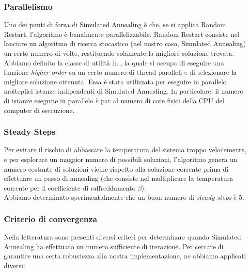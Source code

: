 \subsubsection{Parallelismo}

Uno dei punti di forza di Simulated Annealing è che, se si applica Random Restart, l'algoritmo è banalmente parallelizzabile.
Random Restart consiste nel lanciare un algoritmo di ricerca stocastico (nel nostro caso, Simulated Annealing) un certo numero di volte, restituendo solamente la migliore soluzione trovata. \\

\noindent Abbiamo definito la classe di utilità  in , la quale si occupa di eseguire una funzione \textit{higher-order} su un certo numero di thread paralleli e di selezionare la migliore soluzione ottenuta. Essa è stata utilizzata per eseguire in parallelo molteplici istanze indipendenti di Simulated Annealing. In particolare, il numero di istanze eseguite in parallelo è par al numero di core fisici della CPU del computer di esecuzione.

\subsubsection{Steady Steps}

\noindent Per evitare il rischio di abbassare la temperatura del sistema troppo velocemente, e per esplorare un maggior numero di possibili soluzioni, l'algoritmo genera un numero costante di soluzioni vicine rispetto alla soluzione corrente prima di effettuare un passo di annealing (che consiste nel moltiplicare la temperatura corrente per il coefficiente di raffreddamento $\beta$). \\

\noindent Abbiamo determinato sperimentalmente che un buon numero di \textit{steady steps} è 5.

\subsubsection{Criterio di convergenza}

\noindent Nella letteratura sono presenti diversi criteri per determinare quando Simulated Annealing ha effettuato un numero sufficiente di iterazione. Per cercare di garantire una certa robustezza alla nostra implementazione, ne abbiamo applicati diversi:

